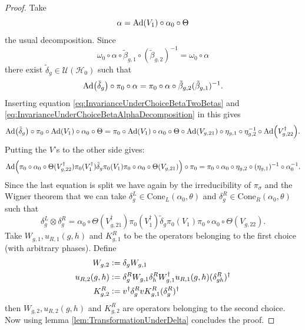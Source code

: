 \documentclass[12pt,a4paper,twoside]{article}
\newcommand{\defeq}{\vcentcolon=}
\let\originalleft\left
\let\originalright\right
\renewcommand{\left}{\mathopen{}\mathclose\bgroup\originalleft}
\renewcommand{\right}{\aftergroup\egroup\originalright}
\newcommand{\UU}{\mathcal U}
\newcommand{\HH}{\mathcal H}
\newcommand{\Ad}[1]{\textrm{Ad}\left(#1\right)}
\theoremstyle{definition}
\numberwithin{equation}{section}
\begin{document}
\begin{proof}
	Take 
	\begin{equation}\label{eq:InvarianceUnderChoiceBetaAlphaDecomposition}
		\alpha=\Ad{V_1}\circ\alpha_{0}\circ\Theta
	\end{equation}
	the usual decomposition. Since
	\begin{equation}
		\omega_0\circ\alpha\circ\tilde{\beta}_{g,1}\circ(\tilde{\beta}_{g,2})^{-1}=\omega_0\circ\alpha
	\end{equation}
	there exist $\tilde{\delta}_g\in\UU(\HH_0)$ such that
	\begin{equation}
		\Ad{\tilde{\delta}_g}\circ\pi_0\circ\alpha=\pi_0\circ\alpha\circ\tilde{\beta}_{g,2}(\tilde{\beta}_{g,1})^{-1}.
	\end{equation}
	Inserting equation \eqref{eq:InvarianceUnderChoiceBetaTwoBetas} and \eqref{eq:InvarianceUnderChoiceBetaAlphaDecomposition} in this gives
	\begin{equation}
		\Ad{\tilde{\delta}_g}\circ\pi_0\circ\Ad{V_1}\circ\alpha_0\circ\Theta=\pi_0\circ\Ad{V_1}\circ\alpha_0\circ\Theta\circ\Ad{V_{g,21}}\circ\eta_{g,1}\circ\eta_{g,2}^{-1}\circ\Ad{V_{g,22}^\dagger}.
	\end{equation}
	Putting the $V$'s to the other side gives:
	\begin{equation}
		\Ad{\pi_0\circ\alpha_0\circ\Theta(V_{g,22}^\dagger)\pi_0(V_1^\dagger)\tilde{\delta}_g\pi_0(V_1)\pi_0\circ\alpha_0\circ\Theta(V_{g,21})}\circ\pi_0=\pi_0\circ\alpha_0\circ\eta_{g,2}\circ(\eta_{g,1})^{-1}\circ\alpha_0^{-1}.
	\end{equation}
	Since the last equation is split we have again by the irreducibility of $\pi_\sigma$ and the Wigner theorem that we can take $\delta_g^L\in\textrm{Cone}_L(\alpha_0,\theta)$ and $\delta_g^R\in\textrm{Cone}_R(\alpha_0,\theta)$ such that
	\begin{equation}
		\delta_g^L\otimes\delta_g^R=\alpha_0\circ\Theta(V_{g,21}^\dagger)\pi_0(V_1^\dagger)\tilde{\delta}_g\pi_0(V_1)\pi_0\circ\alpha_0\circ\Theta(V_{g,22}).
	\end{equation}
	Take $W_{g,1},u_{R,1}(g,h)$ and $K^R_{g,1}$ to be the operators belonging to the first choice (with arbitrary phases). Define
	\begin{align}
		W_{g,2}&\defeq\delta_g W_{g,1}\\
		u_{R,2}(g,h)&\defeq \delta_g^R W_{g,1}\delta_h^R W_{g,1}^\dagger u_{R,1}(g,h)(\delta_{gh}^R)^\dagger\\
		K^R_{g,2}&\defeq v^\dagger \delta_g^R v K_{g,1}^R (\delta_g^R)^\dagger
	\end{align}
	then $W_{g,2},u_{R,2}(g,h)$ and $K^R_{g,2}$ are operators belonging to the second choice. Now using lemma \ref{lem:TransformationUnderDelta} concludes the proof.
\end{proof}
\end{document}
